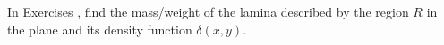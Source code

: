 {\noindent In Exercises}
{, find the mass/weight of the lamina described by the region $R$ in the plane and its density function $\delta(x,y)$.}
